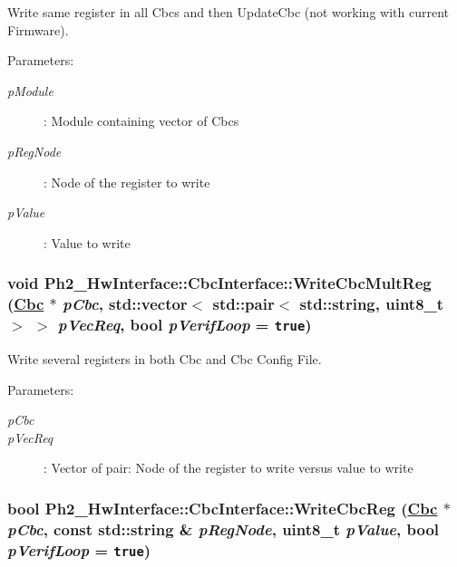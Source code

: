 Write same register in all Cbcs and then Update\-Cbc (not working with current Firmware). 

\begin{Desc}
\item[Parameters:]
\begin{description}
\item[{\em p\-Module}]: Module containing vector of Cbcs \item[{\em p\-Reg\-Node}]: Node of the register to write \item[{\em p\-Value}]: Value to write \end{description}
\end{Desc}
\hypertarget{class_ph2___hw_interface_1_1_cbc_interface_5f7c8908e36e20fc0cb784077d024784}{
\subsubsection[WriteCbcMultReg]{\setlength{\rightskip}{0pt plus 5cm}void Ph2\_\-Hw\-Interface::Cbc\-Interface::Write\-Cbc\-Mult\-Reg (\hyperlink{class_ph2___hw_description_1_1_cbc}{Cbc} $\ast$ {\em p\-Cbc}, std::vector$<$ std::pair$<$ std::string, uint8\_\-t $>$ $>$ {\em p\-Vec\-Req}, bool {\em p\-Verif\-Loop} = {\tt true})}}
\label{class_ph2___hw_interface_1_1_cbc_interface_5f7c8908e36e20fc0cb784077d024784}


Write several registers in both Cbc and Cbc Config File. 

\begin{Desc}
\item[Parameters:]
\begin{description}
\item[{\em p\-Cbc}]\item[{\em p\-Vec\-Req}]: Vector of pair: Node of the register to write versus value to write \end{description}
\end{Desc}
\hypertarget{class_ph2___hw_interface_1_1_cbc_interface_6f35388f75a06e32e784dee21b2c0b1c}{
\subsubsection[WriteCbcReg]{\setlength{\rightskip}{0pt plus 5cm}bool Ph2\_\-Hw\-Interface::Cbc\-Interface::Write\-Cbc\-Reg (\hyperlink{class_ph2___hw_description_1_1_cbc}{Cbc} $\ast$ {\em p\-Cbc}, const std::string \& {\em p\-Reg\-Node}, uint8\_\-t {\em p\-Value}, bool {\em p\-Verif\-Loop} = {\tt true})}}
\label{class_ph2___hw_interface_1_1_cbc_interface_6f35388f75a06e32e784dee21b2c0b1c}


